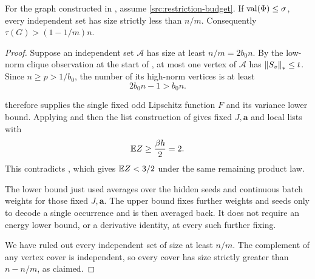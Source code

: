 \begin{corollary}[Soundness]
\label{dec:soundness}
For the graph constructed in , assume
\eqref{src:restriction-budget}.
If \(\operatorname{val}(\Phi)\leq\sigma\), every independent set has size
strictly less than \(n/m\).
Consequently \(\tau(G)>(1-1/m)n\).
\end{corollary}
\begin{proof}
Suppose an independent set \(\mathcal A\) has size at least
\(n/m=2b_0n\). By the low-norm clique observation at the start of
, at most one vertex of \(\mathcal A\) has
\(\left\|S_v\right\|_*\leq t\). Since \(n\geq p>1/b_0\), the number
of its high-norm vertices is at least
\[
 2b_0n-1>b_0n.
\]

 therefore supplies the single fixed odd
Lipschitz function \(F\) and its variance lower bound. Applying
 and then the list construction of
 gives fixed \(J,\mathbf a\)
and local lists with
\[
 \mathbb E Z\geq\frac{\beta h}{2}=2.
\]
This contradicts , which gives \(\mathbb E Z<3/2\)
under the same remaining product law.

The lower bound just used averages over the hidden seeds and
continuous batch weights for those fixed \(J,\mathbf a\).
The upper bound fixes further weights and seeds only to decode a
single occurrence and is then averaged back. It does not require
an energy lower bound, or a derivative identity, at every such
further fixing.

We have ruled out every independent set of size at least \(n/m\).
The complement of any vertex cover is independent, so every cover
has size strictly greater than \(n-n/m\), as claimed.
\end{proof}
